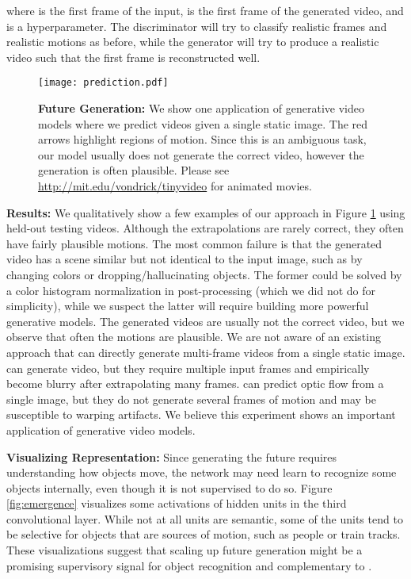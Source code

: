 \documentclass{article}
\begin{document}
 where  is the first frame of the input,  is the first frame of the generated video, and  is a hyperparameter.
The discriminator will try to classify realistic frames and realistic motions as before, while the generator will try to produce a realistic video such that the first frame is reconstructed well.

\begin{figure}
\texttt{[image: prediction.pdf]}
\caption{\textbf{Future Generation:} We show one application of generative video models where we predict videos given a single static image. The red arrows highlight regions of motion. Since this is an ambiguous task, our model usually does not generate the correct video, however the generation is often plausible. Please see \url{http://mit.edu/vondrick/tinyvideo} for animated movies.}
\label{fig:im2animation}
\vspace{-2em}
\end{figure}

\textbf{Results:} We qualitatively show a few examples of our approach in Figure \ref{fig:im2animation} using held-out testing videos. Although the extrapolations are rarely correct, they often have fairly plausible motions. The most common failure is that the generated video has a scene similar but not identical to the input image, such as by changing colors or dropping/hallucinating objects. The former could be solved by a color histogram normalization in post-processing (which we did not do for simplicity), while we suspect the latter will require building more powerful generative models. The generated videos are usually not the correct video, but we observe that often the motions are plausible. We are not aware of an existing approach that can directly generate multi-frame videos from a single static image. \cite{ranzato2014video,mathieu2015deep} can generate video, but they require multiple input frames and empirically become blurry after extrapolating many frames. \cite{walker2014patch,yuen2010data} can predict optic flow from a single image, but they do not generate several frames of motion and may be susceptible to warping artifacts. We believe this experiment shows an important application of generative video models.

\textbf{Visualizing Representation:} Since generating the future requires understanding how objects move, the network may need learn to recognize some objects internally, even though it is not supervised to do so. Figure \ref{fig:emergence} visualizes some activations of hidden units in the third convolutional layer. While not at all units are semantic, some of the units tend to be selective for objects that are sources of motion, such as people or train tracks. These visualizations suggest that scaling up future generation might be a promising supervisory signal for object recognition and complementary to \cite{owens2016ambient,doersch2015unsupervised,wang2015unsupervised}.
\end{document}
